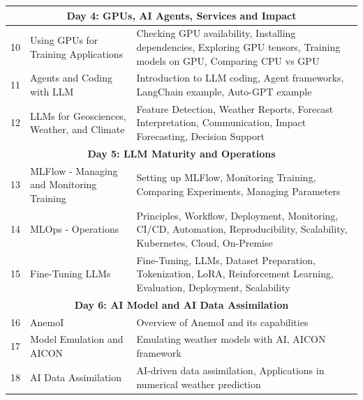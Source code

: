 \begin{longtable}{|c|p{5cm}|p{8cm}|}
\multicolumn{3}{|c|}{\cellcolor{headerblue} \textbf{Day 4: GPUs, AI Agents, Services and Impact}} \\ \hline
\rowcolor{lightblue} 10 & Using GPUs for Training Applications & Checking GPU availability, Installing dependencies, Exploring GPU tensors, Training models on GPU, Comparing CPU vs GPU \\ \hline
11 & Agents and Coding with LLM & Introduction to LLM coding, Agent frameworks, LangChain example, Auto-GPT example \\ \hline
\rowcolor{lightblue} 12 & LLMs for Geosciences, Weather, and Climate & Feature Detection, Weather Reports, Forecast Interpretation, Communication, Impact Forecasting, Decision Support \\ \hline

\multicolumn{3}{|c|}{\cellcolor{headerblue} \textbf{Day 5: LLM Maturity and Operations}} \\ \hline
\rowcolor{lightblue} 13 & MLFlow - Managing and Monitoring Training & Setting up MLFlow, Monitoring Training, Comparing Experiments, Managing Parameters \\ \hline
14 & MLOps - Operations & Principles, Workflow, Deployment, Monitoring, CI/CD, Automation, Reproducibility, Scalability, Kubernetes, Cloud, On-Premise \\ \hline
\rowcolor{lightblue} 15 & Fine-Tuning LLMs & Fine-Tuning, LLMs, Dataset Preparation, Tokenization, LoRA, Reinforcement Learning, Evaluation, Deployment, Scalability \\ \hline

\multicolumn{3}{|c|}{\cellcolor{headerblue} \textbf{Day 6: AI Model and AI Data Assimilation}} \\ \hline
\rowcolor{lightblue} 16 & AnemoI & Overview of AnemoI and its capabilities \\ \hline
17 & Model Emulation and AICON & Emulating weather models with AI, AICON framework \\ \hline
\rowcolor{lightblue} 18 & AI Data Assimilation & AI-driven data assimilation, Applications in numerical weather prediction \\ \hline


\end{longtable}
